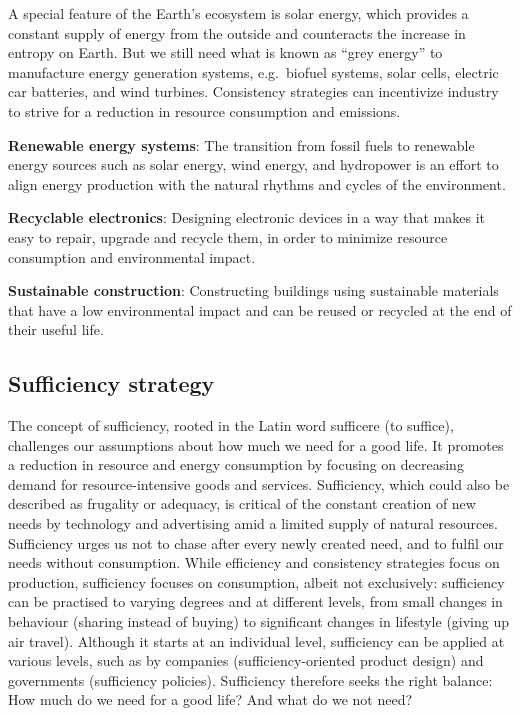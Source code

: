 \documentclass[
  a4paper,
  openany]{book}
\begin{document}
A special feature of the Earth's ecosystem is solar energy, which
provides a constant supply of energy from the outside and counteracts
the increase in entropy on Earth. But we still need what is known as
``grey energy'' to manufacture energy generation systems, e.g.~biofuel
systems, solar cells, electric car batteries, and wind turbines.
Consistency strategies can incentivize industry to strive for a
reduction in resource consumption and emissions.

\begin{tcolorbox}[enhanced jigsaw, left=2mm, arc=.35mm, titlerule=0mm, opacityback=0, leftrule=.75mm, title={Putting Consistency Strategies into Action: Examples}, breakable, bottomtitle=1mm, rightrule=.15mm, coltitle=black, toptitle=1mm, bottomrule=.15mm, colback=white, opacitybacktitle=0.6, colbacktitle=quarto-callout-tip-color!10!white, toprule=.15mm, colframe=quarto-callout-tip-color-frame]

\textbf{Renewable energy systems}: The transition from fossil fuels to
renewable energy sources such as solar energy, wind energy, and
hydropower is an effort to align energy production with the natural
rhythms and cycles of the environment.

\textbf{Recyclable electronics}: Designing electronic devices in a way
that makes it easy to repair, upgrade and recycle them, in order to
minimize resource consumption and environmental impact.

\textbf{Sustainable construction}: Constructing buildings using
sustainable materials that have a low environmental impact and can be
reused or recycled at the end of their useful life.

\end{tcolorbox}

\subsection{Sufficiency strategy}\label{sufficiency-strategy}

The concept of sufficiency, rooted in the Latin word sufficere (to
suffice), challenges our assumptions about how much we need for a good
life. It promotes a reduction in resource and energy consumption by
focusing on decreasing demand for resource-intensive goods and services.
Sufficiency, which could also be described as frugality or adequacy, is
critical of the constant creation of new needs by technology and
advertising amid a limited supply of natural resources. Sufficiency
urges us not to chase after every newly created need, and to fulfil our
needs without consumption. While efficiency and consistency strategies
focus on production, sufficiency focuses on consumption, albeit not
exclusively: sufficiency can be practised to varying degrees and at
different levels, from small changes in behaviour (sharing instead of
buying) to significant changes in lifestyle (giving up air travel).
Although it starts at an individual level, sufficiency can be applied at
various levels, such as by companies (sufficiency-oriented product
design) and governments (sufficiency policies). Sufficiency therefore
seeks the right balance: How much do we need for a good life? And what
do we not need?
\end{document}
